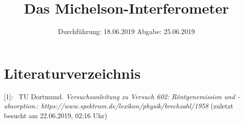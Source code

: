 

\subject{Nr. 401}
\title{Das Michelson-Interferometer}
\date{%
  Durchführung: 18.06.2019
  \hspace{3em}
  Abgabe: 25.06.2019
}



\maketitle
\thispagestyle{empty}
\tableofcontents
\newpage






\section{Literaturverzeichnis}

[1]: \ TU Dortmund. \textit{Versuchsanleitung zu Versuch 602:
Röntgenemission und -absorption.}\newline
[2]: \textit{https://www.spektrum.de/lexikon/physik/brechzahl/1958
} (zuletzt besucht am 22.06.2019, 02:16 Uhr)\newline



\printbibliography{}


